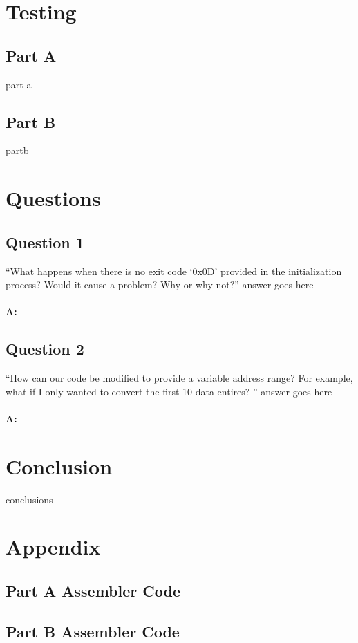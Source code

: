 \documentclass[letterpaper]{article}
\begin{document}
\section{Testing}
  \subsection{Part A}
    part a
    \lipsum[5]

  \subsection{Part B}
    partb
    \lipsum[6]

\section{Questions}

    \subsection{Question 1}
      ``What happens when there is no exit code ‘0x0D’ provided in the initialization process? Would it cause a problem? Why or why not?''
      answer goes here
      \\ \\
      \noindent\textbf{A:}
      \lipsum[7]

    \subsection{Question 2}
      ``How can our code be modified to provide a variable address range? For example, what if I only wanted to convert the first 10 data entires? ''
      answer goes here
      \\ \\
      \noindent\textbf{A:}
      \lipsum[8]

\section{Conclusion}
  conclusions
  \lipsum[9-10]

\newpage
\section{Appendix}
  \subsection{Part A Assembler Code}

    

\newpage

  \subsection{Part B Assembler Code}

    
\end{document}
